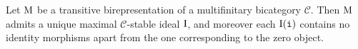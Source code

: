 




\noindent\begin{lemma}\label{UniqueMaximalIdeal} Let $\textup{M}$ be a transitive birepresentation of a multifinitary bicategory $\mathscr{C}$. Then $\textup{M}$ admits a unique maximal $\mathscr{C}$-stable ideal $\textup{I}$, and moreover each $\textup{I}(\textnormal{\texttt{i}})$ contains no identity morphisms apart from the one corresponding to the zero object.\\
\end{lemma}

